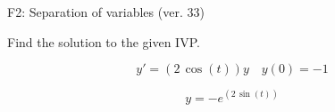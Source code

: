 \begin{exercise}
  \begin{exerciseTitle}F2: Separation of variables (ver. 33)\end{exerciseTitle}
  \begin{exerciseStatement}
    
Find the solution to the given IVP.

    
\[y'=( 2 \, \cos\left(t\right) )y\hspace{1em} y(0)= -1\]

  \end{exerciseStatement}
  \begin{exerciseAnswer}
    
\[y= -e^{\left(2 \, \sin\left(t\right)\right)}\]

  \end{exerciseAnswer}
\end{exercise}